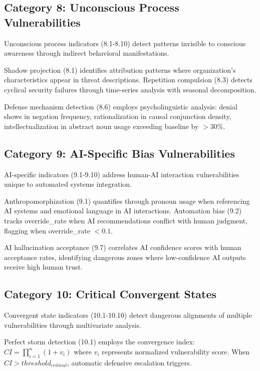 \documentclass[10pt, twocolumn]{article}
\begin{document}
\subsection{Category 8: Unconscious Process Vulnerabilities}

Unconscious process indicators (8.1-8.10) detect patterns invisible to conscious awareness through indirect behavioral manifestations.

Shadow projection (8.1) identifies attribution patterns where organization's characteristics appear in threat descriptions. Repetition compulsion (8.3) detects cyclical security failures through time-series analysis with seasonal decomposition.

Defense mechanism detection (8.6) employs psycholinguistic analysis: denial shows in negation frequency, rationalization in causal conjunction density, intellectualization in abstract noun usage exceeding baseline by $>30\%$.

\subsection{Category 9: AI-Specific Bias Vulnerabilities}

AI-specific indicators (9.1-9.10) address human-AI interaction vulnerabilities unique to automated systems integration.

Anthropomorphization (9.1) quantifies through pronoun usage when referencing AI systems and emotional language in AI interactions. Automation bias (9.2) tracks override\_rate when AI recommendations conflict with human judgment, flagging when override\_rate $< 0.1$.

AI hallucination acceptance (9.7) correlates AI confidence scores with human acceptance rates, identifying dangerous zones where low-confidence AI outputs receive high human trust.

\subsection{Category 10: Critical Convergent States}

Convergent state indicators (10.1-10.10) detect dangerous alignments of multiple vulnerabilities through multivariate analysis.

Perfect storm detection (10.1) employs the convergence index: $CI = \prod_{i=1}^{n} (1 + v_i)$ where $v_i$ represents normalized vulnerability score. When $CI > threshold_{critical}$, automatic defensive escalation triggers.
\end{document}
